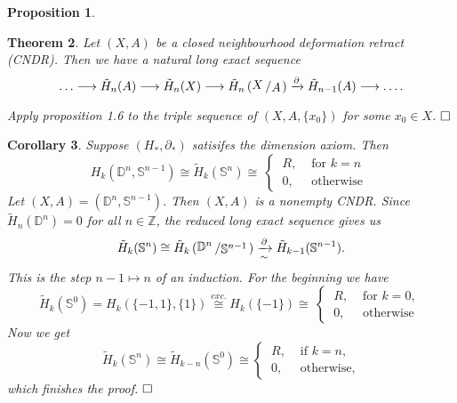 \documentclass[11pt]{book}
\numberwithin{dummy}{section}
\newtheorem{theorem}{Theorem}[section]
\newtheorem{proposition}[theorem]{Proposition}
\newtheorem{corollary}[theorem]{Corollary}
\theoremstyle{nonumberbreak}
\newenvironment{pr}[1][]{\ifthenelse{\equal{#1}{}}{\proof}{\proof[#1]}\rm}{\endproof}
\newcommand{\la}{\longrightarrow}
\newcommand{\Z}{\mathbb{Z}}
\newcommand{\slant}[2]{{\raisebox{.1em}{$#1$}\left/\raisebox{-.1em}{$#2$}\right.}}
\begin{document}
\begin{spacing}{1.4}
\begin{proposition}
\end{proposition}



\begin{theorem}
Let $(X,A)$ be a closed neighbourhood deformation retract (CNDR). Then we have a natural long exact sequence
$$\ldots \la \tilde{H}_n(A) \la \tilde{H}_n(X) \la \tilde{H}_n\left( \slant{X}{A}\right) \xrightarrow{\partial} \tilde{H}_{n-1}(A) \la \ldots. $$
\begin{pr}

Apply proposition 1.6 to the triple sequence of $(X,A,\{x_0\})$ for some $x_0 \in X$. $\hfill \Box$

\end{pr}

\end{theorem}


\begin{corollary}
Suppose $(H_*, \partial_*)$ satisifes the dimension axiom. Then 
$$H_k(\mathbb{D}^n, \mathbb{S}^{n-1}) \cong \tilde{H}_k(\mathbb{S}^n) \cong \ \begin{cases} \ R, & \textrm{ for }k=n\\ \ 0,& \textrm{ otherwise } \end{cases}$$
\begin{pr}
Let $(X,A) = (\mathbb{D}^n, \mathbb{S}^{n-1})$. Then $(X,A)$ is a nonempty CNDR. Since $\tilde{H}_n(\mathbb{D}^n)=0$ for all $n \in \Z$, the reduced long exact sequence gives us
$$\tilde{H}_k(\mathbb{S}^{n}) \cong \tilde{H}_k\left( \slant{\mathbb{D}^n}{\mathbb{S}^{n-1}} \right) \xrightarrow[\sim]{\partial} \tilde{H}_{k-1}(\mathbb{S}^{n-1}).$$
This is the step $n-1 \mapsto n$ of an induction. For the beginning we have
$$\tilde{H}_k(\mathbb{S}^0) = H_k(\{-1,1\}, \{1\}) \overset{exc.}{\cong} H_k(\{-1\}) \cong \ \begin{cases} \ R, & \textrm{ for } k=0,\\ \ 0, & \textrm{ otherwise }\end{cases}$$
Now we get 
$$\tilde{H}_k(\mathbb{S}^n) \cong \tilde{H}_{k-n}(\mathbb{S}^0) \cong \begin{cases} \  R, & \textrm{ if }k=n, \\ \ 0, & \textrm{ otherwise,} \end{cases}$$
which finishes the proof. $\hfill \Box$

\end{pr}



\end{corollary}








\end{spacing}
\end{document}
